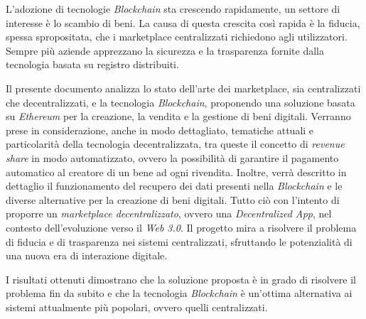 
L'adozione di tecnologie \textit{Blockchain} sta crescendo rapidamente, un settore di interesse è lo scambio di beni. La causa di questa crescita così rapida è la fiducia, spessa spropositata, che i marketplace centralizzati richiedono agli utilizzatori. Sempre più aziende apprezzano la sicurezza e la trasparenza fornite dalla tecnologia basata su registro distribuiti.

Il presente documento analizza lo stato dell'arte dei marketplace, sia centralizzati che decentralizzati, e la tecnologia \textit{Blockchain}, proponendo una soluzione basata su \textit{Ethereum} per la creazione, la vendita e la gestione di beni digitali. 
Verranno prese in considerazione, anche in modo dettagliato, tematiche attuali e particolarità della tecnologia decentralizzata, tra queste il concetto di \textit{revenue share} in modo automatizzato, ovvero la possibilità di garantire il pagamento automatico al creatore di un bene ad ogni rivendita. 
Inoltre, verrà descritto in dettaglio il funzionamento del recupero dei dati presenti nella \textit{Blockchain} e le diverse alternative per la creazione di beni digitali.
Tutto ciò con l'intento di proporre un \textit{marketplace decentralizzato}, ovvero una \textit{Decentralized App}, nel contesto dell'evoluzione verso il \textit{Web 3.0}. Il progetto mira a risolvere il problema di fiducia e di trasparenza nei sistemi centralizzati, sfruttando le potenzialità di una nuova era di interazione digitale.

I risultati ottenuti dimostrano che la soluzione proposta è in grado di risolvere il problema fin da subito e che la tecnologia \textit{Blockchain} è un'ottima alternativa ai sistemi attualmente più popolari, ovvero quelli centralizzati.